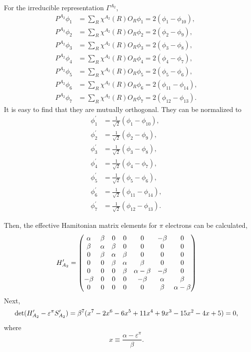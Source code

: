 		For the irreducible representation $\Gamma^{A_2}$,
		\begin{align*}
		P^{A_2}\phi_1 &= \sum_{R} \chi^{A_2}(R) O_R \phi_1 = 2(\phi_1-\phi_{10}) , \\
		P^{A_2}\phi_2 &= \sum_{R} \chi^{A_2}(R) O_R \phi_2 = 2(\phi_2-\phi_9) ,	\\
		P^{A_2}\phi_3 &= \sum_{R} \chi^{A_2}(R) O_R \phi_3 = 2(\phi_3-\phi_8) ,	\\
		P^{A_2}\phi_4 &= \sum_{R} \chi^{A_2}(R) O_R \phi_4 = 2(\phi_4-\phi_7) ,	\\
		P^{A_2}\phi_5 &= \sum_{R} \chi^{A_2}(R) O_R \phi_5 = 2(\phi_5-\phi_6) ,	\\
		P^{A_2}\phi_6 &= \sum_{R} \chi^{A_2}(R) O_R \phi_6 = 2(\phi_{11}-\phi_{14}) ,	\\
		P^{A_2}\phi_7 &= \sum_{R} \chi^{A_2}(R) O_R \phi_7 = 2(\phi_{12}-\phi_{13}) .
		\end{align*}
		It is easy to find that they are mutually orthogonal. They can be normalized to
		\begin{align*}
		\phi^\prime_1 &= \frac{1}{\sqrt{2}} (\phi_1-\phi_{10}) , \\
		\phi^\prime_2 &= \frac{1}{\sqrt{2}} (\phi_2-\phi_9) , \\
		\phi^\prime_3 &= \frac{1}{\sqrt{2}} (\phi_3-\phi_8) , \\
		\phi^\prime_4 &= \frac{1}{\sqrt{2}} (\phi_4-\phi_7) , \\
		\phi^\prime_5 &= \frac{1}{\sqrt{2}} (\phi_5-\phi_6) , \\
		\phi^\prime_6 &= \frac{1}{\sqrt{2}} (\phi_{11}-\phi_{14}) , \\		
		\phi^\prime_7 &= \frac{1}{\sqrt{2}} (\phi_{12}-\phi_{13}) .
		\end{align*}
		
		Then, the effective Hamitonian matrix elements for $\pi$ electrons can be calculated,
		\begin{equation*}
			H^\prime_{A_2} = \begin{pmatrix}
\alpha&\beta&	0	&	0	&		0	&	-\beta 	&	0	\\
\beta&\alpha&\beta	&	0	&		0	&	0	&	0	\\
0	&\beta	&\alpha	&\beta	&		0	&	0	&	0	\\
0	&	0	&\beta	&\alpha	&	\beta	&	0	&	0	\\
0	&	0	&	0	&\beta	&\alpha-\beta&	-\beta	&	0\\
-\beta&	0	&	0	&	0	& -\beta	&	\alpha	&	\beta \\
0	&	0	&	0	&	0	&	0		&	\beta	&\alpha-\beta\\
			\end{pmatrix}					
		\end{equation*}
		Next,
		\begin{align*}
			\det(H^\prime_{A_2}-\varepsilon^\pi S^\prime_{A_2}) = \beta^7 ( x^7 - 2x^6 - 6x^5 + 11x^4 + 9x^3 -15x^2 -4x +5 ) = 0,
		\end{align*}
		where
		\begin{equation*}
			x \equiv \frac{\alpha - \varepsilon^\pi}{\beta}.
		\end{equation*}
		
